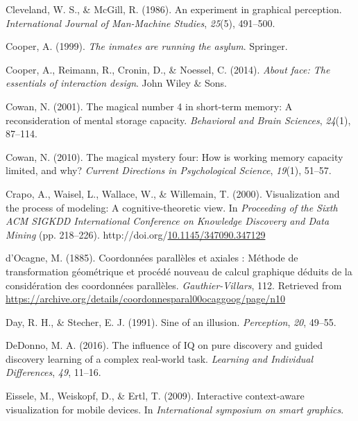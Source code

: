 \documentclass[print]{nuthesis}
\newlength{\cslhangindent}
\newenvironment{CSLReferences}[2]%
{\setlength{\parindent}{0pt}%
\everypar{\setlength{\hangindent}{\cslhangindent}}\ignorespaces}%
{\par}
\begin{document}
\begin{CSLReferences}{1}{0}
\leavevmode{}%
Cleveland, W. S., \& McGill, R. (1986). An experiment in graphical perception. \emph{International Journal of Man-Machine Studies}, \emph{25}(5), 491--500.

\leavevmode{}%
Cooper, A. (1999). \emph{The inmates are running the asylum}. Springer.

\leavevmode{}%
Cooper, A., Reimann, R., Cronin, D., \& Noessel, C. (2014). \emph{About face: The essentials of interaction design}. John Wiley \& Sons.

\leavevmode{}%
Cowan, N. (2001). The magical number 4 in short-term memory: A reconsideration of mental storage capacity. \emph{Behavioral and Brain Sciences}, \emph{24}(1), 87--114.

\leavevmode{}%
Cowan, N. (2010). The magical mystery four: How is working memory capacity limited, and why? \emph{Current Directions in Psychological Science}, \emph{19}(1), 51--57.

\leavevmode{}%
Crapo, A., Waisel, L., Wallace, W., \& Willemain, T. (2000). Visualization and the process of modeling: A cognitive-theoretic view. In \emph{Proceeding of the Sixth ACM SIGKDD International Conference on Knowledge Discovery and Data Mining} (pp. 218--226). http://doi.org/\href{https://doi.org/10.1145/347090.347129}{10.1145/347090.347129}

\leavevmode{}%
d'Ocagne, M. (1885). {Coordonnées parallèles et axiales : Méthode de transformation géométrique et procédé nouveau de calcul graphique déduits de la considération des coordonnées parallèles}. \emph{Gauthier-Villars}, 112. Retrieved from \url{https://archive.org/details/coordonnesparal00ocaggoog/page/n10}

\leavevmode{}%
Day, R. H., \& Stecher, E. J. (1991). Sine of an illusion. \emph{Perception}, \emph{20}, 49--55.

\leavevmode{}%
DeDonno, M. A. (2016). The influence of IQ on pure discovery and guided discovery learning of a complex real-world task. \emph{Learning and Individual Differences}, \emph{49}, 11--16.

\leavevmode{}%
Eissele, M., Weiskopf, D., \& Ertl, T. (2009). Interactive context-aware visualization for mobile devices. In \emph{International symposium on smart graphics}.


\end{CSLReferences}
\end{document}
